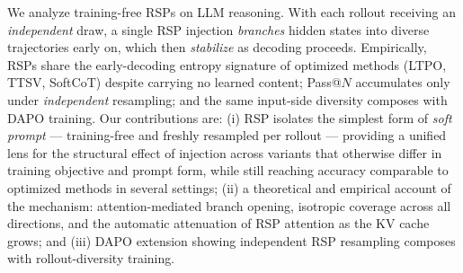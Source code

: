 We analyze training-free RSPs on LLM reasoning. With each rollout receiving an \emph{independent} draw, a single RSP injection \emph{branches} hidden states into diverse trajectories early on, which then \emph{stabilize} as decoding proceeds. Empirically, RSPs share the early-decoding entropy signature of optimized methods (LTPO, TTSV, SoftCoT) despite carrying no learned content; Pass@$N$ accumulates only under \emph{independent} resampling; and the same input-side diversity composes with DAPO \citep{yu2025dapo} training. Our contributions are: (i) RSP isolates the simplest form of \textit{soft prompt} --- training-free and freshly resampled per rollout --- providing a unified lens for the structural effect of injection across variants that otherwise differ in training objective and prompt form, while still reaching accuracy comparable to optimized methods in several settings; (ii) a theoretical and empirical account of the mechanism: attention-mediated branch opening, isotropic coverage across all directions, and the automatic attenuation of RSP attention as the KV cache grows; and (iii) DAPO extension showing independent RSP resampling composes with rollout-diversity training.
